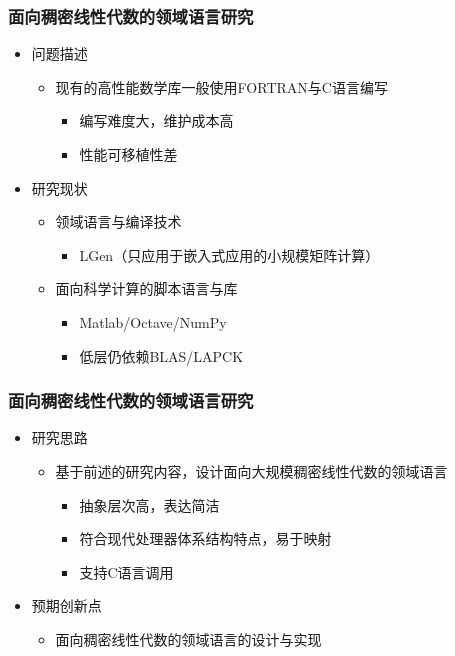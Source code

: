 \documentclass[aspectratio=169]{beamer}
\begin{document}
\begin{frame}
  \frametitle{面向稠密线性代数的领域语言研究}
  \begin{itemize}
  \item 问题描述
    \begin{itemize}
    \item 现有的高性能数学库一般使用FORTRAN与C语言编写
      \begin{itemize}
      \item 编写难度大，维护成本高
      \item 性能可移植性差
      \end{itemize}
    \end{itemize}
  \item 研究现状
    \begin{itemize}
    \item 领域语言与编译技术
      \begin{itemize}
      \item LGen（只应用于嵌入式应用的小规模矩阵计算）
      \end{itemize}
    \item 面向科学计算的脚本语言与库
      \begin{itemize}
      \item Matlab/Octave/NumPy
      \item 低层仍依赖BLAS/LAPCK
      \end{itemize}
    \end{itemize}
  \end{itemize}
\end{frame}

\begin{frame}
  \frametitle{面向稠密线性代数的领域语言研究}
  \begin{itemize}
  \item 研究思路
    \begin{itemize}
    \item 基于前述的研究内容，设计面向大规模稠密线性代数的领域语言
      \begin{itemize}
      \item 抽象层次高，表达简洁
      \item 符合现代处理器体系结构特点，易于映射
      \item 支持C语言调用
      \end{itemize}
    \end{itemize}
  \item 预期创新点
    \begin{itemize}
    \item 面向稠密线性代数的领域语言的设计与实现
    \end{itemize}
  \end{itemize}
\end{frame}
\end{document}
